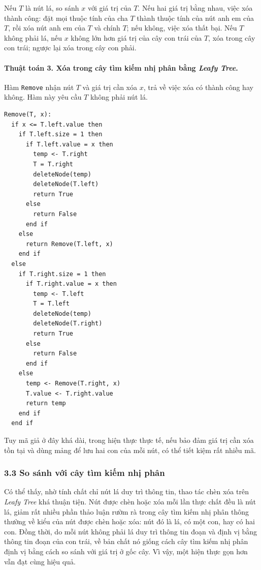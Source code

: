 \documentclass[11pt]{article}
\begin{document}
Nếu \(T\) là nút lá, so sánh \(x\) với giá trị của \(T\). Nếu hai giá trị bằng
nhau, việc xóa thành công: đặt mọi thuộc tính của cha \(T\) thành thuộc tính
của nút anh em của \(T\), rồi xóa nút anh em của \(T\) và chính \(T\); nếu
không, việc xóa thất bại. Nếu \(T\) không phải lá, nếu \(x\) không lớn hơn giá
trị của cây con trái của \(T\), xóa trong cây con trái; ngược lại xóa trong cây
con phải.

\paragraph{Thuật toán 3. Xóa trong cây tìm kiếm nhị phân bằng \emph{Leafy Tree}.}
Hàm \texttt{Remove} nhận nút \(T\) và giá trị cần xóa \(x\), trả về việc xóa có
thành công hay không. Hàm này yêu cầu \(T\) không phải nút lá.
\begin{verbatim}
Remove(T, x):
  if x <= T.left.value then
    if T.left.size = 1 then
      if T.left.value = x then
        temp <- T.right
        T = T.right
        deleteNode(temp)
        deleteNode(T.left)
        return True
      else
        return False
      end if
    else
      return Remove(T.left, x)
    end if
  else
    if T.right.size = 1 then
      if T.right.value = x then
        temp <- T.left
        T = T.left
        deleteNode(temp)
        deleteNode(T.right)
        return True
      else
        return False
      end if
    else
      temp <- Remove(T.right, x)
      T.value <- T.right.value
      return temp
    end if
  end if
\end{verbatim}

Tuy mã giả ở đây khá dài, trong hiện thực thực tế, nếu bảo đảm giá trị cần xóa
tồn tại và dùng mảng để lưu hai con của mỗi nút, có thể tiết kiệm rất nhiều mã.

\subsubsection*{3.3 So sánh với cây tìm kiếm nhị phân}

Có thể thấy, nhờ tính chất chỉ nút lá duy trì thông tin, thao tác chèn xóa trên
\emph{Leafy Tree} khá thuận tiện. Nút được chèn hoặc xóa mỗi lần thực chất đều
là nút lá, giảm rất nhiều phần thảo luận rườm rà trong cây tìm kiếm nhị phân
thông thường về kiểu của nút được chèn hoặc xóa: nút đó là lá, có một con, hay
có hai con. Đồng thời, do mỗi nút không phải lá duy trì thông tin đoạn và định
vị bằng thông tin đoạn của con trái, về bản chất nó giống cách cây tìm kiếm nhị
phân định vị bằng cách so sánh với giá trị ở gốc cây. Vì vậy, một hiện thực gọn
hơn vẫn đạt cùng hiệu quả.
\end{document}
